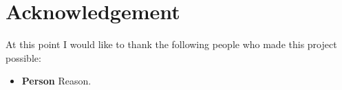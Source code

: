 \chapter*{Acknowledgement}
\label{acknowledgement}
At this point I would like to thank the following people who made this project possible:

\begin{itemize}
\item \textbf{Person} Reason. 

\end{itemize}
